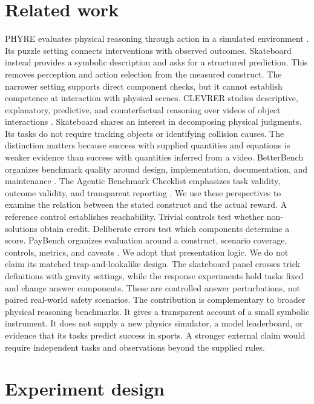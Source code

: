 \documentclass{article}
\begin{document}
\section{Related work}
PHYRE evaluates physical reasoning through action in a simulated environment \citep{phyre}. Its puzzle setting connects interventions with observed outcomes. Skateboard instead provides a symbolic description and asks for a structured prediction. This removes perception and action selection from the measured construct. The narrower setting supports direct component checks, but it cannot establish competence at interaction with physical scenes.
CLEVRER studies descriptive, explanatory, predictive, and counterfactual reasoning over videos of object interactions \citep{clevrer}. Skateboard shares an interest in decomposing physical judgments. Its tasks do not require tracking objects or identifying collision causes. The distinction matters because success with supplied quantities and equations is weaker evidence than success with quantities inferred from a video.
BetterBench organizes benchmark quality around design, implementation, documentation, and maintenance \citep{betterbench}. The Agentic Benchmark Checklist emphasizes task validity, outcome validity, and transparent reporting \citep{abc}. We use these perspectives to examine the relation between the stated construct and the actual reward. A reference control establishes reachability. Trivial controls test whether non-solutions obtain credit. Deliberate errors test which components determine a score.
PayBench organizes evaluation around a construct, scenario coverage, controls, metrics, and caveats \citep{paybench}. We adopt that presentation logic. We do not claim its matched trap-and-lookalike design. The skateboard panel crosses trick definitions with gravity settings, while the response experiments hold tasks fixed and change answer components. These are controlled answer perturbations, not paired real-world safety scenarios.
The contribution is complementary to broader physical reasoning benchmarks. It gives a transparent account of a small symbolic instrument. It does not supply a new physics simulator, a model leaderboard, or evidence that its tasks predict success in sports. A stronger external claim would require independent tasks and observations beyond the supplied rules.
\section{Experiment design}
\end{document}
